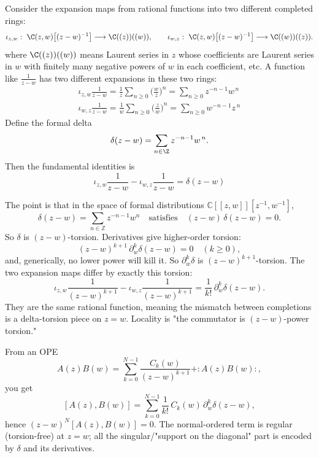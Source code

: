 \documentclass[12pt]{article}
\begin{document}
\begin{remark}
     Consider the expansion maps from rational functions into two different completed rings:
    \[
        \iota_{z,w}:\ \C(z,w)\!\left[(z-w)^{-1}\right]\longrightarrow \C((z))((w)),
        \qquad
        \iota_{w,z}:\ \C(z,w)\!\left[(z-w)^{-1}\right]\longrightarrow \C((w))((z)).
    \] where \( \C((z))((w)) \) means Laurent series in $z$ whose coefficients are Laurent series in $w$ with finitely many negative powers of $w$ in each coefficient, etc. A function like \( \frac{1}{z-w} \) has two different expansions in these two rings: \begin{align*}
        \iota_{z,w}\frac{1}{z-w}
        = \frac{1}{z}\sum_{n\ge0}\Big(\frac{w}{z}\Big)^n
        = \sum_{n\ge0} z^{-n-1} w^{\,n} \\
        \iota_{w,z}\frac{1}{z-w}
        = \frac{1}{w}\sum_{n\ge0}\Big(\frac{z}{w}\Big)^n
        = \sum_{n\ge0} w^{-n-1} z^{\,n}
    \end{align*}
    Define the formal delta
    \[
        \delta(z-w)=\sum_{n\in\Z} z^{-n-1}w^{\,n}.
    \]
    Then the fundamental identities is
    \[
        \iota_{z,w}\frac{1}{z-w}-\iota_{w,z}\frac{1}{z-w}= \delta(z-w)
    \]
\end{remark}
The point is that in the space of formal distributions $\mathbb{C}[[z,w]][z^{-1},w^{-1}]$,
\[
    \delta(z-w)=\sum_{n\in\mathbb{Z}} z^{-n-1}w^n
    \quad\text{satisfies}\quad
    (z-w)\,\delta(z-w)=0.
\]
So $\delta$ is $(z-w)$-torsion. Derivatives give higher-order torsion:
\[
    (z-w)^{k+1}\,\partial_w^k\delta(z-w)=0\quad(k\ge0),
\]
and, generically, no lower power will kill it. So $\partial_w^k\delta$ is $(z-w)^{k+1}$-torsion. The two expansion maps differ by exactly this torsion:
\[
    \iota_{z,w}\frac{1}{(z-w)^{k+1}}-\iota_{w,z}\frac{1}{(z-w)^{k+1}}
    =\frac{1}{k!}\,\partial_w^k\delta(z-w).
\]
They are the same rational function, meaning the mismatch between completions is a delta-torsion piece on $z=w$. Locality is "the commutator is $(z-w)$-power torsion."

From an OPE
\[
    A(z)B(w)=\sum_{k=0}^{N-1}\frac{C_k(w)}{(z-w)^{k+1}}+ :A(z)B(w):,
\]
you get
\[
    [A(z),B(w)]=\sum_{k=0}^{N-1}\frac{1}{k!}\,C_k(w)\,\partial_w^k\delta(z-w),
\]
hence $(z-w)^N[A(z),B(w)]=0$. The normal-ordered term is regular (torsion-free) at $z=w$; all the singular/"support on the diagonal" part is encoded by $\delta$ and its derivatives.
\end{document}
